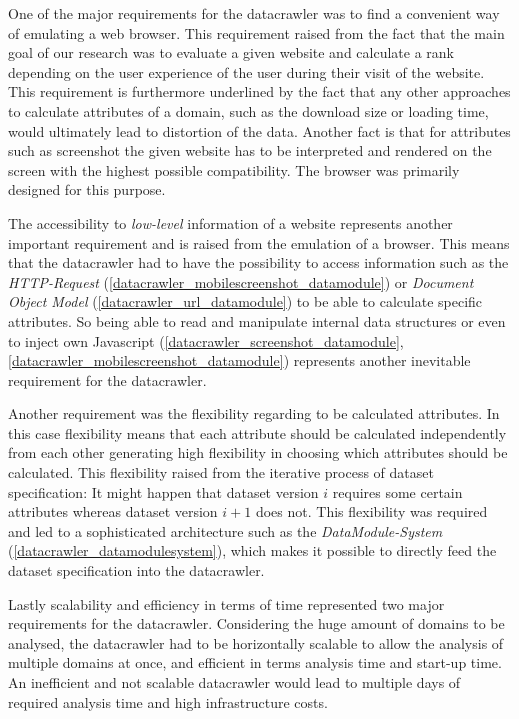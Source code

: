 One of the major requirements for the datacrawler was to find a convenient way of emulating a web browser. This requirement raised from the fact that the main goal of our research was to evaluate a given website and calculate a rank depending on the user experience of the user during their visit of the website. This requirement is furthermore underlined by the fact that any other approaches to calculate attributes of a domain, such as the download size or loading time, would ultimately lead to distortion of the data. Another fact is that for attributes such as screenshot the given website has to be interpreted and rendered on the screen with the highest possible compatibility. The browser was primarily designed for this purpose.

The accessibility to \textit{low-level} information of a website represents another important requirement and is raised from the emulation of a browser. This means that the datacrawler had to have the possibility to access information such as the \textit{HTTP-Request} (\ref{datacrawler_mobilescreenshot_datamodule}) or \textit{Document Object Model} (\ref{datacrawler_url_datamodule}) to be able to calculate specific attributes. So being able to read and manipulate internal data structures or even to inject own Javascript (\ref{datacrawler_screenshot_datamodule}, \ref{datacrawler_mobilescreenshot_datamodule})  represents another inevitable requirement for the datacrawler.

Another requirement was the flexibility regarding to be calculated attributes. In this case flexibility means that each attribute should be calculated independently from each other generating high flexibility in choosing which attributes should be calculated. This flexibility raised from the iterative process of dataset specification: It might happen that dataset version $i$ requires some certain attributes whereas dataset version $i+1$ does not. This flexibility was required and led to a sophisticated architecture such as the \textit{DataModule-System} (\ref{datacrawler_datamodulesystem}), which makes it possible to directly feed the dataset specification into the datacrawler.

Lastly scalability and efficiency in terms of time represented two major requirements for the datacrawler. Considering the huge amount of domains to be analysed, the datacrawler had to be horizontally scalable to allow the analysis of multiple domains at once, and efficient in terms analysis time and start-up time. An inefficient and not scalable datacrawler would lead to multiple days of required analysis time and high infrastructure costs.

